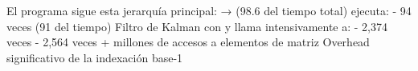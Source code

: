 \markdownRendererUlEndTight \markdownRendererInterblockSeparator
{}
\markdownRendererSectionEnd \markdownRendererSectionBegin
{}\markdownRendererInterblockSeparator
{}El programa sigue esta jerarquía principal:\markdownRendererInterblockSeparator
{}\markdownRendererOlBeginTight
{} →  (98.6\markdownRendererPercentSign{} del tiempo total)\markdownRendererOlItemEnd 
{} ejecuta:\markdownRendererOlItemEnd 
\markdownRendererOlEndTight \markdownRendererInterblockSeparator
{}\markdownRendererUlBeginTight
\markdownRendererUlItem {} - 94 veces (91\markdownRendererPercentSign{} del tiempo)\markdownRendererUlItemEnd 
\markdownRendererUlItem Filtro de Kalman con  y \markdownRendererUlItemEnd 
\markdownRendererUlEndTight \markdownRendererInterblockSeparator
{}\markdownRendererOlBeginTight
{} llama intensivamente a:\markdownRendererOlItemEnd 
\markdownRendererOlEndTight \markdownRendererInterblockSeparator
{}\markdownRendererUlBeginTight
\markdownRendererUlItem {} - 2,374 veces \markdownRendererUlItemEnd 
\markdownRendererUlItem {} - 2,564 veces\markdownRendererUlItemEnd 
\markdownRendererUlEndTight \markdownRendererInterblockSeparator
{}
\markdownRendererSectionEnd \markdownRendererSectionBegin
{}\markdownRendererInterblockSeparator
{}\markdownRendererSectionBegin
{}\markdownRendererInterblockSeparator
{}\markdownRendererUlBeginTight
{}+ millones de accesos a elementos de matriz\markdownRendererUlItemEnd 
\markdownRendererUlItem Overhead significativo de la indexación base-1\markdownRendererUlItemEnd 
\markdownRendererUlEndTight \markdownRendererInterblockSeparator
{}
\markdownRendererSectionEnd \markdownRendererSectionBegin
{}\markdownRendererInterblockSeparator
{}\markdownRendererUlBeginTight

